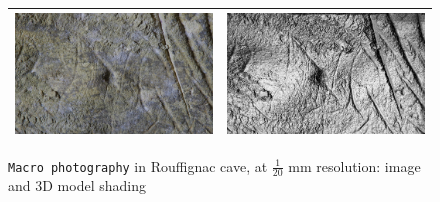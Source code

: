 \begin{figure}
\begin{tabular}{||c|c||}
   \hline \hline
   \includegraphics[width=80mm]{FIGS/SAMPLES/ROUFF-IM.JPG}&
   \includegraphics[width=80mm]{FIGS/SAMPLES/ROUFF-SHADE.jpg} \\ \hline  \hline
\end{tabular}
\caption{{\tt Macro photography} in Rouffignac cave, at $\frac{1}{20}$ mm resolution: image and 3D model shading}
\end{figure}


